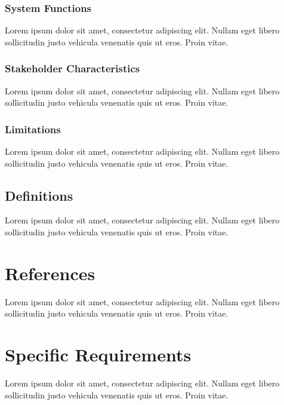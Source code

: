 \documentclass[a4paper]{article}
\begin{document}
                \subsubsection{System Functions}

                Lorem ipsum dolor sit amet, consectetur adipiscing elit. Nullam eget libero sollicitudin justo vehicula venenatis quis ut eros. Proin vitae.

                \subsubsection{Stakeholder Characteristics}

                Lorem ipsum dolor sit amet, consectetur adipiscing elit. Nullam eget libero sollicitudin justo vehicula venenatis quis ut eros. Proin vitae.

                \subsubsection{Limitations}

                Lorem ipsum dolor sit amet, consectetur adipiscing elit. Nullam eget libero sollicitudin justo vehicula venenatis quis ut eros. Proin vitae.

            \subsection{Definitions}

            Lorem ipsum dolor sit amet, consectetur adipiscing elit. Nullam eget libero sollicitudin justo vehicula venenatis quis ut eros. Proin vitae.

    \section{References}

    Lorem ipsum dolor sit amet, consectetur adipiscing elit. Nullam eget libero sollicitudin justo vehicula venenatis quis ut eros. Proin vitae.

    \section{Specific Requirements}

    Lorem ipsum dolor sit amet, consectetur adipiscing elit. Nullam eget libero sollicitudin justo vehicula venenatis quis ut eros. Proin vitae.
\end{document}
